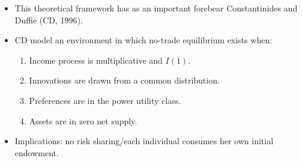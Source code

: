 \documentclass[notes=show]{beamer}
\begin{document}
\begin{frame}%


\begin{itemize}
\item This theoretical framework has as an important forebear Constantinides
and Duffie (CD, 1996).

\item CD model an environment in which no-trade equilibrium exists when:

\begin{enumerate}
\item Income process is multiplicative and $I\left( 1\right) $.

\item Innovations are drawn from a common distribution.

\item Preferences are in the power utility class.

\item Assets are in zero net supply.
\end{enumerate}

\item Implications: no risk sharing/each individual consumes her own initial
endowment.
\end{itemize}

\transboxout%
\end{frame}%

\bigskip
\end{document}
